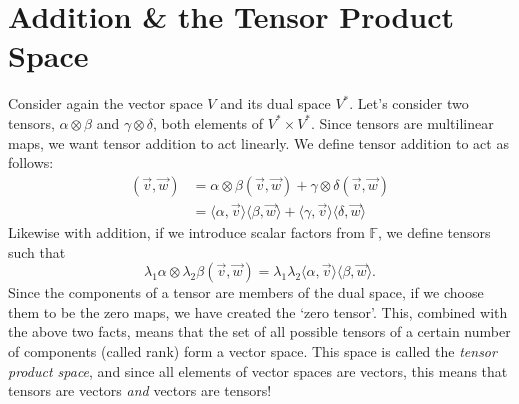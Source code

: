 \section{Addition \& the Tensor Product Space}
Consider again the vector space $V$ and its dual space $V^*$. Let's consider two tensors, $\alpha \otimes \beta$ and $\gamma \otimes \delta$, both elements of $V^* \times V^*$.
Since tensors are multilinear maps, we want tensor addition to act linearly. 
We define tensor addition to act as follows:
\begin{align*}
    [\alpha \otimes \beta + \gamma \otimes \delta](\vec{v},\vec{w}) &= \alpha\otimes\beta (\vec{v},\vec{w}) + \gamma\otimes\delta(\vec{v},\vec{w}) \\
    &= \langle \alpha, \vec{v} \rangle\langle \beta, \vec{w} \rangle + \langle \gamma, \vec{v} \rangle\langle \delta,\vec{w} \rangle
\end{align*}
Likewise with addition, if we introduce scalar factors from $\mathbb{F}$, we define tensors such that
\[\lambda_1\alpha\otimes\lambda_2\beta(\vec{v},\vec{w}) = \lambda_1\lambda_2\langle \alpha, \vec{v} \rangle\langle \beta, \vec{w} \rangle.\]
Since the components of a tensor are members of the dual space, if we choose them to be the zero maps, we have created the `zero tensor'. 
This, combined with the above two facts, means that the set of all possible tensors of a certain number of components (called rank) form a vector space. 
This space is called the \emph{tensor product space}, and since all elements of vector spaces are vectors, this means that tensors are vectors \emph{and} vectors are tensors!

